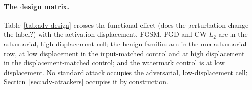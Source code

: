 \documentclass[../ppgc-tese.tex]{subfiles}
\begin{document}
\paragraph*{The design matrix.}
Table~\ref{tab:adv-design} crosses the functional effect (does the
perturbation change the label?) with the activation displacement. FGSM, PGD
and CW-$L_2$ are in the adversarial, high-displacement cell; the benign
families are in the non-adversarial row, at low displacement in the
input-matched control and at high displacement in the displacement-matched
control; and the watermark control is at low displacement. No standard attack
occupies the adversarial, low-displacement cell;
Section~\ref{sec:adv-attackers} occupies it by construction.
\end{document}
